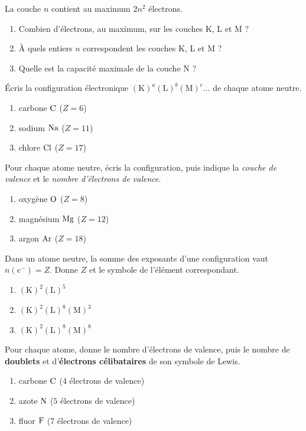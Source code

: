 \documentclass[11pt,a4paper]{article}
\begin{document}
\begin{exo}
La couche $n$ contient au maximum $2n^2$ électrons.
\begin{enumerate}[label=\alph*)]
  \item Combien d'électrons, au maximum, sur les couches K, L et M ?
  \item À quels entiers $n$ correspondent les couches K, L et M ?
  \item Quelle est la capacité maximale de la couche N ?
\end{enumerate}
\end{exo}

\begin{exo}
Écris la configuration électronique $(\mathrm{K})^a(\mathrm{L})^b(\mathrm{M})^c\dots$ de chaque atome
neutre.
\begin{enumerate}[label=\alph*)]
  \item carbone $\ce{C}$ ($Z = 6$)
  \item sodium $\ce{Na}$ ($Z = 11$)
  \item chlore $\ce{Cl}$ ($Z = 17$)
\end{enumerate}
\end{exo}

\begin{exo}
Pour chaque atome neutre, écris la configuration, puis indique la \emph{couche de valence} et le
\emph{nombre d'électrons de valence}.
\begin{enumerate}[label=\alph*)]
  \item oxygène $\ce{O}$ ($Z = 8$)
  \item magnésium $\ce{Mg}$ ($Z = 12$)
  \item argon $\ce{Ar}$ ($Z = 18$)
\end{enumerate}
\end{exo}

\begin{exo}
Dans un atome neutre, la somme des exposants d'une configuration vaut $n(e^-) = Z$. Donne $Z$ et le
symbole de l'élément correspondant.
\begin{enumerate}[label=\alph*)]
  \item $(\mathrm{K})^2(\mathrm{L})^5$
  \item $(\mathrm{K})^2(\mathrm{L})^8(\mathrm{M})^3$
  \item $(\mathrm{K})^2(\mathrm{L})^8(\mathrm{M})^8$
\end{enumerate}
\end{exo}

\begin{exo}
Pour chaque atome, donne le nombre d'électrons de valence, puis le nombre de \textbf{doublets} et
d'\textbf{électrons célibataires} de son symbole de Lewis.
\begin{enumerate}[label=\alph*)]
  \item carbone $\ce{C}$ ($4$ électrons de valence)
  \item azote $\ce{N}$ ($5$ électrons de valence)
  \item fluor $\ce{F}$ ($7$ électrons de valence)
\end{enumerate}
\end{exo}
\end{document}
